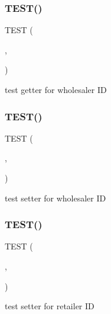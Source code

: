 \subsubsection{\texorpdfstring{T\+E\+S\+T()}{TEST()}\hspace{0.1cm}{\footnotesize\ttfamily [13/54]}}
{\footnotesize\ttfamily T\+E\+ST (\begin{DoxyParamCaption}\item[{game\+Test}]{,  }\item[{get\+P\+Wholesaler\+Id\+Test}]{ }\end{DoxyParamCaption})}

test getter for wholesaler ID \mbox{\label{group__group2_gacb89ab5d3fa1011f55e2e604fb161833}} 
\subsubsection{\texorpdfstring{T\+E\+S\+T()}{TEST()}\hspace{0.1cm}{\footnotesize\ttfamily [14/54]}}
{\footnotesize\ttfamily T\+E\+ST (\begin{DoxyParamCaption}\item[{game\+Test}]{,  }\item[{set\+P\+Wholesaler\+Id\+Test}]{ }\end{DoxyParamCaption})}

test setter for wholesaler ID \mbox{\label{group__group2_ga7b0dc9afd3edf6a6947d5d8e0499b0a4}} 
\subsubsection{\texorpdfstring{T\+E\+S\+T()}{TEST()}\hspace{0.1cm}{\footnotesize\ttfamily [15/54]}}
{\footnotesize\ttfamily T\+E\+ST (\begin{DoxyParamCaption}\item[{game\+Test}]{,  }\item[{set\+P\+Retailer\+Id\+Test}]{ }\end{DoxyParamCaption})}

test setter for retailer ID \mbox{\label{group__group2_ga8024925544cf99f0e7cce5597988d8bc}} 
